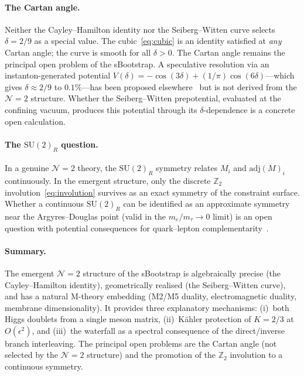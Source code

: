 \documentclass[aps,prd,twocolumn,showpacs,preprintnumbers,superscriptaddress,floatfix]{revtex4-2}
\newcommand{\SU}{\mathrm{SU}}
\newcommand{\adj}{\mathrm{adj}}
\begin{document}
\paragraph{The Cartan angle.}
Neither the Cayley--Hamilton identity nor the Seiberg--Witten
curve selects $\delta = 2/9$ as a special value.
The cubic~\eqref{eq:cubic} is an identity satisfied at
\emph{any} Cartan angle; the curve is smooth for all $\delta > 0$.
The Cartan angle remains the principal open problem of the
sBootstrap.
A speculative resolution via an instanton-generated potential
$V(\delta) = -\cos(3\delta) + (1/\pi)\cos(6\delta)$---which gives
$\delta \approx 2/9$ to $0.1\%$---has been proposed
elsewhere~\cite{Rivero:2024epjc} but is not derived from the
$\mathcal{N}{=}2$ structure.
Whether the Seiberg--Witten prepotential, evaluated at the
confining vacuum, produces this potential through its
$\delta$-dependence is a concrete open calculation.

\paragraph{The $\SU(2)_R$ question.}
In a genuine $\mathcal{N}{=}2$ theory, the $\SU(2)_R$ symmetry
relates $M_i$ and $\adj(M)_i$ continuously.
In the emergent structure, only the discrete $\mathbb{Z}_2$
involution~\eqref{eq:involution} survives as an exact symmetry
of the constraint surface.
Whether a continuous $\SU(2)_R$ can be identified as an
approximate symmetry near the Argyres--Douglas point
(valid in the $m_e/m_\tau \to 0$ limit) is an open question
with potential consequences for quark--lepton
complementarity~\cite{Zenczykowski:2012}.

\paragraph{Summary.}
The emergent $\mathcal{N}{=}2$ structure of the sBootstrap is
algebraically precise (the Cayley--Hamilton identity), geometrically
realised (the Seiberg--Witten curve), and has a natural M-theory
embedding (M2/M5 duality, electromagnetic duality, membrane
dimensionality).
It provides three explanatory mechanisms:
(i)~both Higgs doublets from a single meson matrix,
(ii)~K\"ahler protection of $K = 2/3$ at $O(\epsilon^2)$, and
(iii)~the waterfall as a spectral consequence of the direct/inverse
branch interleaving.
The principal open problems are the Cartan angle (not selected by
the $\mathcal{N}{=}2$ structure) and the promotion of the
$\mathbb{Z}_2$ involution to a continuous symmetry.
\end{document}
